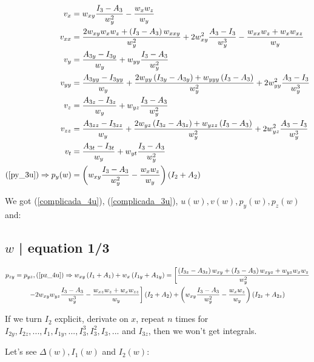 \documentclass[12pt,a4paper]{article}
\begin{document}
	\begin{align}
	  v_x &= w_{xy} \frac{I_3 - A_3}{w_y^2} - \frac{w_x w_z}{w_y} \\
	  v_{xx} &= \frac{2 w_{xy} w_x w_z + \left( I_3 - A_3 \right) w_{xxy}}{w_y^2} + 2 w_{xy}^2 \frac{A_3 - I_3}{w_y^3} - \frac{w_{xx} w_z + w_x w_{xz}}{w_y} \\
	  v_y &= \frac{A_{3y} - I_{3y}}{w_y} + w_{yy} \frac{I_3 - A_3}{w_y^2} \\
	  v_{yy} &= \frac{A_{3yy} - I_{3yy}}{w_y} + \frac{2 w_{yy} \left( I_{3y} - A_{3y} \right) + w_{yyy} \left( I_3 - A_3 \right)}{w_y^2} + 2 w_{yy}^2 \frac{A_3 - I_3}{w_y^3} \\
	  v_z &= \frac{A_{3z} - I_{3z}}{w_y} + w_{yz} \frac{I_3 - A_3}{w_y^2} \\
	  v_{zz} &= \frac{A_{3zz} - I_{3zz}}{w_y} + \frac{2 w_{yz} \left( I_{3z} - A_{3z} \right) + w_{yzz} \left( I_3 - A_3 \right)}{w_y^2} + 2 w_{yz}^2 \frac{A_3 - I_3}{w_y^3} \\
	  v_t &= \frac{A_{3t} - I_{3t}}{w_y} + w_{yt} \frac{I_3 - A_3}{w_y^2} \\
	  (\ref{py_3u}) \Rightarrow p_y(w) &= \left( w_{xy} \frac{I_3 - A_3}{w_y^2} - \frac{w_x w_z}{w_y} \right) \left( I_2 + A_2 \right)
	\end{align}

	We got (\ref{complicada_4u}), (\ref{complicada_3u}), $u(w), v(w), p_y(w), p_z(w)$ and:

\subsection{$w$ | equation 1/3}

	\begin{multline}
	  p_{zy} = p_{yz}, (\ref{pz_4u}) \Rightarrow  w_{xy} \left( I_1 + A_1 \right) + w_x \left( I_{1y} + A_{1y} \right) = \biggl[ \frac{\left( I_{3z} - A_{3z} \right) w_{xy} + \left( I_3 - A_3 \right) w_{xyz} + w_{yz} w_x w_z}{w_y^2} \\
- 2 w_{xy} w_{yz} \frac{I_3 - A_3}{w_y^3} - \frac{w_{xz} w_z + w_x w_{zz}}{w_y} \biggr] \left( I_2 + A_2 \right) + \left( w_{xy} \frac{I_3 - A_3}{w_y^2} - \frac{w_x w_z}{w_y} \right) \left( I_{2z} + A_{2z} \right) \label{pyzzy}
	\end{multline}

	If we turn $I_2$ explicit, derivate on $x$, repeat $n$ times for $I_{2y}, I_{2z}, ..., I_1, I_{1y}, ..., I_3^3, I_3^2, I_3, ...$ and $I_{3z}$, then we won't get integrals.

	Let's see $\Delta(w), I_1(w)$ and $I_2(w)$:
\end{document}
